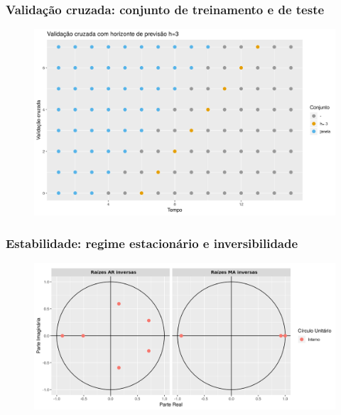 \documentclass[mathserif,serif]{beamer}
\begin{document}
\begin{frame}
	\frametitle{Validação cruzada: conjunto de treinamento e de teste}
	\begin{figure}
		\centering
		\includegraphics[scale=0.5]{crossh3}
	\end{figure}
\end{frame}

\begin{frame}
	\frametitle{Estabilidade: regime estacionário e inversibilidade}
	\begin{figure}
		\centering
		\includegraphics[width=\textwidth]{conds}
	\end{figure}
\end{frame}
\end{document}

